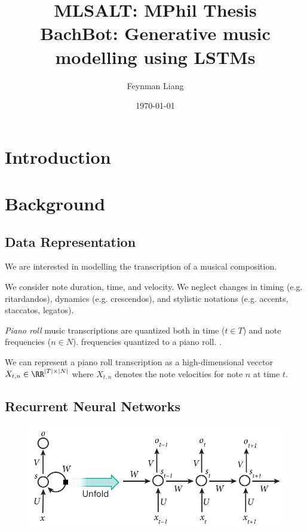 \documentclass[a4paper,oneside,reqno,onecolumn]{amsart}
\newcommand{\authorname}{Feynman Liang}
\newcommand{\coursename}{MLSALT: MPhil Thesis}
\newcommand{\assignmentname}{BachBot: Generative music modelling using LSTMs}
\begin{document}
\title{\coursename\\\assignmentname}
\author{\authorname}
\address[A1]{Churchill College}
\date{\today}

\maketitle

\section{Introduction}

\section{Background}

\subsection{Data Representation}

We are interested in modelling the transcription of a musical composition.

We consider note duration, time, and velocity. We neglect changes in timing
(e.g. ritardandos), dynamics (e.g. crescendos), and stylistic notations (e.g.
accents, staccatos, legatos).


\emph{Piano roll} music transcriptions are quantized both in time ($t \in T$)
and note frequencies ($n \in N$). frequencies quantized to a piano roll.
.

We can represent a piano roll transcription as a high-dimensional vecctor
$X_{t,n} \in \RR^{|T| \times |N|}$ where $X_{t,n}$ denotes the note velocities
for note $n$ at time $t$.

\subsection{Recurrent Neural Networks}

\begin{figure}[htpb]
    \centering
    \includegraphics[width=0.8\linewidth]{Figures/rnn.jpg}
    \caption{}
\end{figure}
\end{document}
